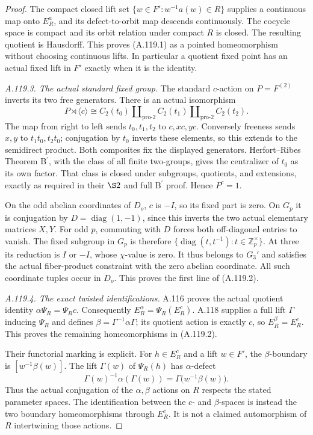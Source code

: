 \begin{proof}
The compact closed lift set
\(\{w\in F':w^{-1}a(w)\in R\}\) supplies a continuous map
onto \(E_R^a\), and its defect-to-orbit map descends continuously.
The cocycle space is compact and its orbit relation under
compact \(R\) is closed. The resulting quotient is Hausdorff.
This proves (A.119.1) as a pointed homeomorphism without
choosing continuous lifts.
In particular a quotient fixed point has an actual fixed
lift in \(F'\) exactly when it is the identity.

\emph{A.119.3. The actual standard fixed group.}
The standard \(c\)-action on \(P=F^{(2)}\) inverts its two
free generators. There is an actual isomorphism
\[
 P\rtimes\langle c\rangle
       \cong C_2(t_0)\amalg_{\mathrm{pro}\text{-}2}
                       C_2(t_1)\amalg_{\mathrm{pro}\text{-}2}C_2(t_2).
 \tag{A.119.5}
\]
The map from right to left sends \(t_0,t_1,t_2\) to \(c,xc,yc\).
Conversely freeness sends \(x,y\) to \(t_1t_0,t_2t_0\);
conjugation by \(t_0\) inverts these elements, so this extends
to the semidirect product. Both composites fix the displayed
generators.
Herfort--Ribes Theorem B\(^{\prime}\), with the class of all
finite two-groups, gives the centralizer of \(t_0\) as its
own factor. \citep{A_HR1985}
That class is closed under subgroups, quotients, and extensions,
exactly as required in their \(\S2\) and full B\(^{\prime}\)
proof. Hence \(P^c=1\).

On the odd abelian coordinates of \(D_o\), \(c\) is \(-I\),
so its fixed part is zero. On \(G_p\) it is conjugation by
\(D=\operatorname{diag}(1,-1)\), since this inverts the two
actual elementary matrices \(X,Y\).
For odd \(p\), commuting with \(D\) forces both off-diagonal
entries to vanish. The fixed subgroup in \(G_p\) is therefore
\(\{\operatorname{diag}(t,t^{-1}):t\in\mathbb Z_p^\times\}\).
At three its reduction is \(I\) or \(-I\), whose \(\chi\)-value
is zero. It thus belongs to \(G_3'\) and satisfies the actual
fiber-product constraint with the zero abelian coordinate.
All such coordinate tuples occur in \(D_o\).
This proves the first line of (A.119.2).

\emph{A.119.4. The exact twisted identifications.}
A.116 proves the actual quotient identity
\(\alpha\Psi_R=\Psi_Rc\). Consequently
\(E_R^\alpha=\Psi_R(E_R^c)\).
A.118 supplies a full lift \(\Gamma\) inducing \(\Psi_R\) and
defines \(\beta=\Gamma^{-1}\alpha\Gamma\); its quotient action
is exactly \(c\), so \(E_R^\beta=E_R^c\).
This proves the remaining homeomorphisms in (A.119.2).

Their functorial marking is explicit. For \(h\in E_R^c\)
and a lift \(w\in F'\), the \(\beta\)-boundary is
\([w^{-1}\beta(w)]\). The lift \(\Gamma(w)\) of \(\Psi_R(h)\)
has \(\alpha\)-defect
\[
       \Gamma(w)^{-1}\alpha(\Gamma(w))
                    =\Gamma\bigl(w^{-1}\beta(w)\bigr).
 \tag{A.119.6}
\]
Thus the actual conjugation of the \(\alpha,\beta\) actions
on \(R\) respects the stated parameter spaces.
The identification between the \(c\)- and \(\beta\)-spaces
is instead the two boundary homeomorphisms through \(E_R^c\).
It is not a claimed automorphism of \(R\) intertwining those
actions.


\end{proof}
